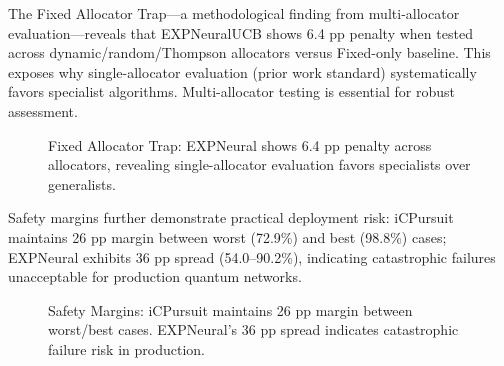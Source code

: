 \documentclass[10pt,twocolumn,journal]{IEEEtran}
\begin{document}
The Fixed Allocator Trap—a methodological finding from multi-allocator evaluation—reveals that EXPNeuralUCB shows 6.4 pp penalty when tested across dynamic/random/Thompson allocators versus Fixed-only baseline. This exposes why single-allocator evaluation (prior work standard) systematically favors specialist algorithms. Multi-allocator testing is essential for robust assessment.

\begin{figure}[t]
\centering
{}
\caption{Fixed Allocator Trap: EXPNeural shows 6.4 pp penalty across allocators, revealing single-allocator evaluation favors specialists over generalists.}
\label{fig:generalization_penalty}
\end{figure}

Safety margins further demonstrate practical deployment risk: iCPursuit maintains 26 pp margin between worst (72.9\%) and best (98.8\%) cases; EXPNeural exhibits 36 pp spread (54.0--90.2\%), indicating catastrophic failures unacceptable for production quantum networks.

\begin{figure}[t]
\centering
{}
\caption{Safety Margins: iCPursuit maintains 26 pp margin between worst/best cases. EXPNeural's 36 pp spread indicates catastrophic failure risk in production.}
\label{fig:safety_margins}
\end{figure}
\end{document}
